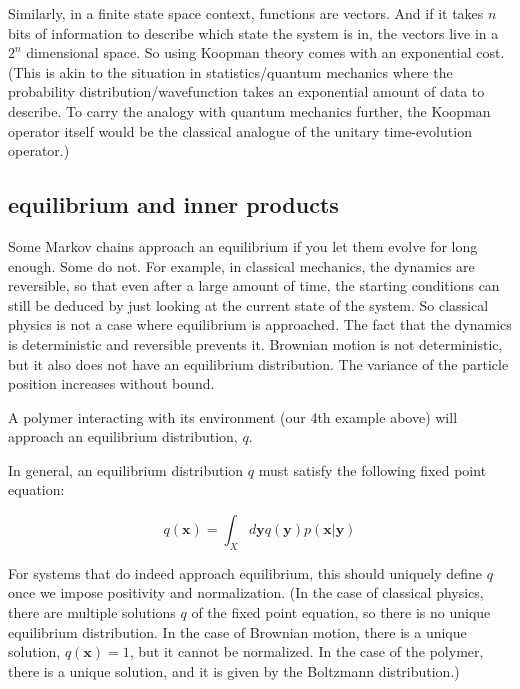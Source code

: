 \documentclass[]{article}
\newcommand{\p}[1]{\left( #1 \right)}
\newcommand{\w}[1]{\mathbf{#1}}
\newcommand{\Kp}{\mathcal{K}}
\begin{document}
Similarly, in a finite state space context, functions are vectors. And if it takes $n$ bits of information to describe which state the system is in, the vectors live in a $2^n$ dimensional space. So using Koopman theory comes with an exponential cost. (This is akin to the situation in statistics/quantum mechanics where the probability distribution/wavefunction takes an exponential amount of data to describe. To carry the analogy with quantum mechanics further, the Koopman operator itself would be the classical analogue of the unitary time-evolution operator.)


\subsection{equilibrium and inner products}

Some Markov chains approach an equilibrium if you let them evolve for long enough. Some do not. For example, in classical mechanics, the dynamics are reversible, so that even after a large amount of time, the starting conditions can still be deduced by just looking at the current state of the system. So classical physics is not a case where equilibrium is approached. The fact that the dynamics is deterministic and reversible prevents it. Brownian motion is not deterministic, but it also does not have an equilibrium distribution. The variance of the particle position increases without bound.

A polymer interacting with its environment (our 4th example above) will approach an equilibrium distribution, $q$.

In general, an equilibrium distribution $q$ must satisfy the following fixed point equation:

$$
q(\w{x}) = \int_X d\w{y} q(\w{y}) p(\w{x}|\w{y})
$$

\iffalse

$$
\int_X d\w{z}
\delta(\w{x}-\w{z})
q(\w{x})
= \int_X d\w{z}
\delta(\w{x}-\w{z})
\int_X d\w{y} q(\w{y}) p(\w{x}|\w{y})
$$

$$
q(\w{x})
=
\int_X d\w{y} q(\w{y})
\int_X d\w{z} \delta(\w{x}-\w{z})
p(\w{z}|\w{y})
$$

$$
q(\w{x})
=
\int_X d\w{y} q(\w{y})
\p{\Kp\hspace{0.2cm} \lambda\w{z}.\delta(\w{x}-\w{z})}(\w{y})
$$

\fi

For systems that do indeed approach equilibrium, this should uniquely define $q$ once we impose positivity and normalization. (In the case of classical physics, there are multiple solutions $q$ of the fixed point equation, so there is no unique equilibrium distribution. In the case of Brownian motion, there is a unique solution, $q(\w{x}) = 1$, but it cannot be normalized. In the case of the polymer, there is a unique solution, and it is given by the Boltzmann distribution.)
\end{document}
